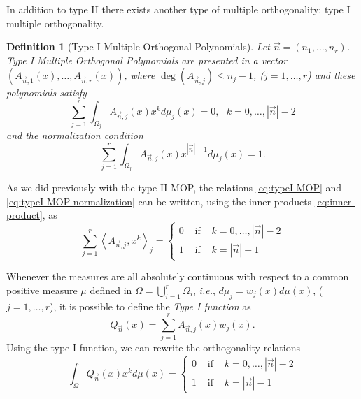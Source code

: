 \documentclass[12pt,a4]{report}
\theoremstyle{plain}
\newtheorem{definition}[theorem]{Definition}
\newcommand{\prodesc}[2]{\left\langle #1 , #2 \right\rangle}
\begin{document}
In addition to type II there exists another type of multiple orthogonality: type I multiple orthogonality.

\begin{definition}[Type I Multiple Orthogonal Polynomials]
    \label{def:typeI-univar}
    Let $\vec n = (n_1,\dots,n_r)$. Type I Multiple Orthogonal Polynomials are presented in a vector $(A_{\vec n, 1}(x), \dots, A_{\vec n, r}(x))$, where $\deg(A_{\vec n, j})\leq n_j-1$, ($j=1,\dots,r$) and these polynomials satisfy
    \begin{equation}
        \label{eq:typeI-MOP}
        \sum_{j=1}^r \int_{\Omega_j}A_{\vec n, j}(x) x^k d\mu_j(x) = 0,  \ \ \ k=0,\dots,|\vec n|-2
    \end{equation}
    and the normalization condition
    \begin{equation}
        \label{eq:typeI-MOP-normalization}
        \sum_{j=1}^r \int_{\Omega_j}A_{\vec n, j}(x) x^{|\vec n|-1} d\mu_j(x) = 1.
    \end{equation}
    
\end{definition}

As we did previously with the type II MOP, the relations \eqref{eq:typeI-MOP} and \eqref{eq:typeI-MOP-normalization} can be written, using the inner products \eqref{eq:inner-product}, as
\begin{equation}
    \label{eq:typeI-MOP-dot}
    \sum_{j=1}^r \prodesc{A_{\vec n,j}}{x^k}_j = \left\{\begin{array}{ccl}
        0 &   \text{ if } & k=0,\dots,|\vec n|-2 \\
        1 & \text{ if } & k=|\vec n|-1      
    \end{array}\right.
\end{equation}

Whenever the measures are all absolutely continuous with respect to a common positive measure $\mu$ defined in $\Omega = \displaystyle\bigcup_{i=1}^r \Omega_i$, \textit{i.e.}, $d\mu_j = w_j(x) d\mu(x)$, ($j=1,\dots,r$), it is possible to define the \textit{Type I function} as
\begin{equation}
    \label{eq:typeI-function}
    Q_{\vec n}(x)=\sum_{j=1}^r A_{\vec n,j}(x)w_j(x).
\end{equation}
Using the type I function, we can rewrite the orthogonality relations
\begin{equation}
    \label{eq:typeI-MOP-function}
    \int_\Omega Q_{\vec n}(x) x^k d\mu(x) = \left\{\begin{array}{ccl}
        0 &   \text{ if } & k=0,\dots,|\vec n|-2 \\
        1 & \text{ if } & k=|\vec n|-1      
    \end{array}\right.
\end{equation}
\end{document}
